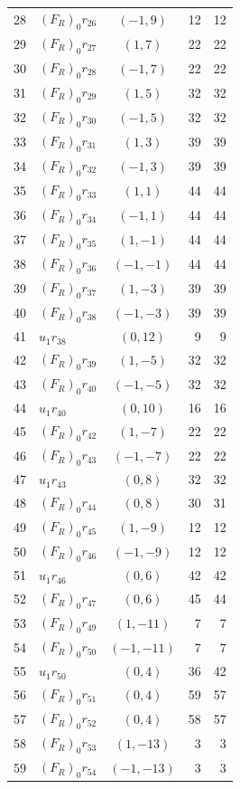 \begin{longtable}{@{}rlcrr@{}}
28 & $(F_R)_0r_{26}$ & $(-1,9)$ & 12 & 12\\
29 & $(F_R)_0r_{27}$ & $(1,7)$ & 22 & 22\\
30 & $(F_R)_0r_{28}$ & $(-1,7)$ & 22 & 22\\
31 & $(F_R)_0r_{29}$ & $(1,5)$ & 32 & 32\\
32 & $(F_R)_0r_{30}$ & $(-1,5)$ & 32 & 32\\
33 & $(F_R)_0r_{31}$ & $(1,3)$ & 39 & 39\\
34 & $(F_R)_0r_{32}$ & $(-1,3)$ & 39 & 39\\
35 & $(F_R)_0r_{33}$ & $(1,1)$ & 44 & 44\\
36 & $(F_R)_0r_{34}$ & $(-1,1)$ & 44 & 44\\
37 & $(F_R)_0r_{35}$ & $(1,-1)$ & 44 & 44\\
38 & $(F_R)_0r_{36}$ & $(-1,-1)$ & 44 & 44\\
39 & $(F_R)_0r_{37}$ & $(1,-3)$ & 39 & 39\\
40 & $(F_R)_0r_{38}$ & $(-1,-3)$ & 39 & 39\\
41 & $u_1r_{38}$ & $(0,12)$ & 9 & 9\\
42 & $(F_R)_0r_{39}$ & $(1,-5)$ & 32 & 32\\
43 & $(F_R)_0r_{40}$ & $(-1,-5)$ & 32 & 32\\
44 & $u_1r_{40}$ & $(0,10)$ & 16 & 16\\
45 & $(F_R)_0r_{42}$ & $(1,-7)$ & 22 & 22\\
46 & $(F_R)_0r_{43}$ & $(-1,-7)$ & 22 & 22\\
47 & $u_1r_{43}$ & $(0,8)$ & 32 & 32\\
48 & $(F_R)_0r_{44}$ & $(0,8)$ & 30 & 31\\
49 & $(F_R)_0r_{45}$ & $(1,-9)$ & 12 & 12\\
50 & $(F_R)_0r_{46}$ & $(-1,-9)$ & 12 & 12\\
51 & $u_1r_{46}$ & $(0,6)$ & 42 & 42\\
52 & $(F_R)_0r_{47}$ & $(0,6)$ & 45 & 44\\
53 & $(F_R)_0r_{49}$ & $(1,-11)$ & 7 & 7\\
54 & $(F_R)_0r_{50}$ & $(-1,-11)$ & 7 & 7\\
55 & $u_1r_{50}$ & $(0,4)$ & 36 & 42\\
56 & $(F_R)_0r_{51}$ & $(0,4)$ & 59 & 57\\
57 & $(F_R)_0r_{52}$ & $(0,4)$ & 58 & 57\\
58 & $(F_R)_0r_{53}$ & $(1,-13)$ & 3 & 3\\
59 & $(F_R)_0r_{54}$ & $(-1,-13)$ & 3 & 3\\

\end{longtable}
